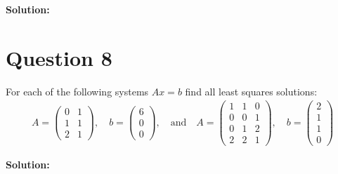 \documentclass{article}
\begin{document}
\vspace{0.25cm}\noindent\textbf{Solution:}

\section*{Question 8}
For each of the following systems $Ax = b$ find all least squares solutions:
\begin{align*}
    A = \begin{pmatrix} 0 & 1 \\ 1 & 1 \\ 2 & 1 \end{pmatrix}, \quad 
    b = \begin{pmatrix} 6 \\ 0 \\ 0 \end{pmatrix}, \quad \text{and} \quad
    A = \begin{pmatrix} 1 & 1 & 0 \\ 0 & 0 & 1 \\ 0 & 1 & 2 \\ 2 & 2 & 1 \end{pmatrix}, \quad 
    b = \begin{pmatrix} 2 \\ 1 \\ 1 \\ 0 \end{pmatrix}
\end{align*}

\vspace{0.25cm}\noindent\textbf{Solution:}
\end{document}
